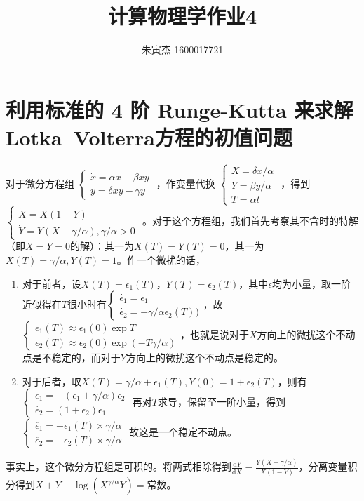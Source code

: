 \documentclass[UTF8,size=9.5]{ctexart}
\title{计算物理学作业4}
\author{朱寅杰 1600017721}
\begin{document}
\maketitle

\section{利用标准的 4 阶 Runge-Kutta 来求解Lotka–Volterra方程的初值问题}
对于微分方程组
$\begin{cases}
	\dot{x}=\alpha x-\beta xy \\
	\dot{y}=\delta xy-\gamma y
\end{cases}$
，作变量代换
$\begin{cases}
	X=\delta x/\alpha\\
	Y=\beta y/\alpha\\
	T=\alpha t
\end{cases}$
，得到
$\begin{cases}
\dot{X}=X(1-Y)\\
\dot{Y}=Y(X-\gamma/\alpha),\gamma/\alpha>0
\end{cases}$
。对于这个方程组，我们首先考察其不含时的特解（即$\dot{X}=\dot{Y}=0$的解）：其一为$X(T)=Y(T)=0$，其一为$X(T)=\gamma/\alpha,Y(T)=1$。作一个微扰的话，
\begin{enumerate}[label={\alph*)},font=\bfseries]
\item 对于前者，设$X(T)=\epsilon_1(T)$，$Y(T)=\epsilon_2(T)$，其中$\epsilon$均为小量，取一阶近似得在$T$很小时有$\begin{cases}\dot{\epsilon_1}=\epsilon_1\\\dot{\epsilon_2}=-\gamma/\alpha\epsilon_2(T))\end{cases}$，故$\begin{cases}\epsilon_1(T)\approx\epsilon_1(0)\exp{T}\\\epsilon_2(T)\approx\epsilon_2(0)\exp{(-T\gamma/\alpha)}\end{cases}$，也就是说对于$X$方向上的微扰这个不动点是不稳定的，而对于$Y$方向上的微扰这个不动点是稳定的。
\item 对于后者，取$X(T)=\gamma/\alpha+\epsilon_1(T),Y(0)=1+\epsilon_2(T)$，则有$\begin{cases}
                                                                         \dot{\epsilon_1}=-(\epsilon_1+\gamma/\alpha)\epsilon_2\\
                                                                         \dot{\epsilon_2}=(1+\epsilon_2)\epsilon_1
                                                                       \end{cases}$
再对$T$求导，保留至一阶小量，得到$\begin{cases}
                  \ddot{\epsilon_1}=-\epsilon_1(T)\times\gamma/\alpha\\
                  \ddot{\epsilon_2}=-\epsilon_2(T)\times\gamma/\alpha
                \end{cases}$
                故这是一个稳定不动点。
\end{enumerate}
事实上，这个微分方程组是可积的。将两式相除得到$\frac{\mathrm{d}Y}{\mathrm{d}X}=\frac{Y(X-\gamma/\alpha)}{X(1-Y)}$，分离变量积分得到$X+Y-\log{(X^{\gamma/\alpha}Y)}=$常数。
\end{document}
